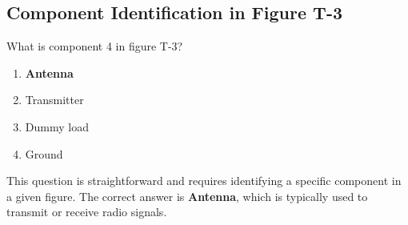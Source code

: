 \subsection{Component Identification in Figure T-3}
\label{T6C11}

\begin{tcolorbox}[colback=gray!10!white,colframe=black!75!black,title=T6C11]
What is component 4 in figure T-3?
\begin{enumerate}[noitemsep]
    \item \textbf{Antenna}
    \item Transmitter
    \item Dummy load
    \item Ground
\end{enumerate}
\end{tcolorbox}

This question is straightforward and requires identifying a specific component in a given figure. The correct answer is \textbf{Antenna}, which is typically used to transmit or receive radio signals.